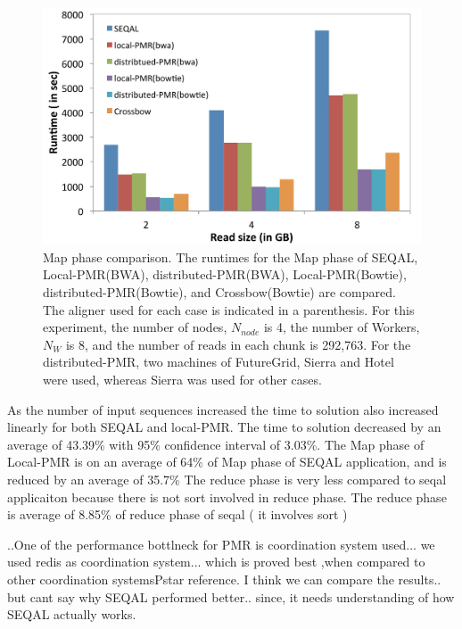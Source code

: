 \documentclass{sig-alternate}
\begin{document}
\begin{figure} 
 \centering
\includegraphics[scale=0.40]{figures/map_comp.pdf}
\caption{\small  Map phase comparison.  The runtimes for the Map phase of SEQAL, Local-PMR(BWA), distributed-PMR(BWA), Local-PMR(Bowtie), distributed-PMR(Bowtie), and Crossbow(Bowtie) are compared.  The aligner used for each case is indicated in a parenthesis.  For this experiment, the number of nodes, $N_{node}$ is 4, the number of Workers, $N_W$ is 8, and the number of reads in each chunk is 292,763.  For the distributed-PMR, two machines of FutureGrid, Sierra and Hotel were used, whereas Sierra was used for other cases.}
  \label{fig:tool_comp} 
\end{figure}




As the number of input sequences increased the time to solution also increased linearly for both SEQAL and local-PMR. 
The time to solution decreased by an average of 43.39\% with 95\% confidence interval of 3.03\%. The Map phase of Local-PMR is on an average of 64\% of Map phase of SEQAL application, and is reduced by an average of 35.7\%
The reduce phase is very less compared to seqal applicaiton because there is not sort involved in reduce phase.
The reduce phase is average of 8.85\% of reduce phase of seqal  ( it involves sort )

..One of the performance bottlneck for PMR is coordination system used... we used redis as coordination system... which is proved best ,when compared to other coordination systems{Pstar reference}. I think we can compare the results.. but cant say why SEQAL performed better.. since, it needs understanding of how SEQAL actually works.
\end{document}

